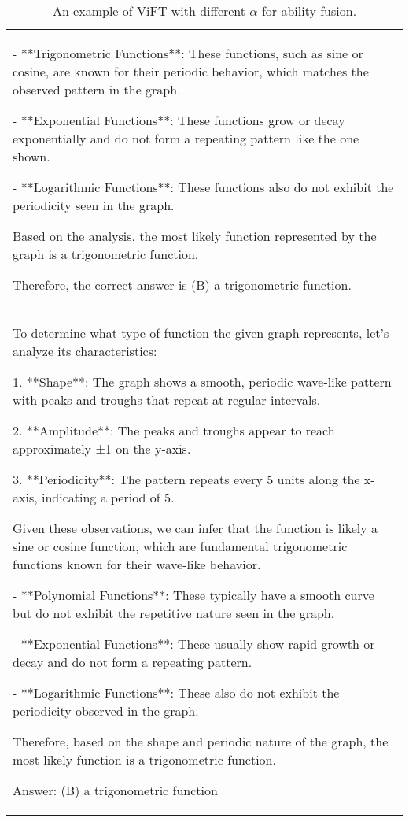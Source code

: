 \begin{table*}[htbp]
\begin{tabular}{p{14cm}}
\begin{tcolorbox}[colback=gray!5, colframe=gray!40, sharp corners, width=\linewidth, boxrule=0.5mm]
- **Trigonometric Functions**: These functions, such as sine or cosine, are known for their periodic behavior, which matches the observed pattern in the graph.

- **Exponential Functions**: These functions grow or decay exponentially and do not form a repeating pattern like the one shown.

- **Logarithmic Functions**: These functions also do not exhibit the periodicity seen in the graph.

Based on the analysis, the most likely function represented by the graph is a trigonometric function.

Therefore, the correct answer is (B) a trigonometric function.

\end{tcolorbox}

        \begin{tcolorbox}[colback=gray!5, colframe=gray!40, sharp corners, width=\linewidth, boxrule=0.5mm]
        \small
        \textbf{$\alpha=1.0$:}
        \\
To determine what type of function the given graph represents, let's analyze its characteristics:

1. **Shape**: The graph shows a smooth, periodic wave-like pattern with peaks and troughs that repeat at regular intervals.

2. **Amplitude**: The peaks and troughs appear to reach approximately ±1 on the y-axis.

3. **Periodicity**: The pattern repeats every 5 units along the x-axis, indicating a period of 5.

Given these observations, we can infer that the function is likely a sine or cosine function, which are fundamental trigonometric functions known for their wave-like behavior.

- **Polynomial Functions**: These typically have a smooth curve but do not exhibit the repetitive nature seen in the graph.

- **Exponential Functions**: These usually show rapid growth or decay and do not form a repeating pattern.

- **Logarithmic Functions**: These also do not exhibit the periodicity observed in the graph.

Therefore, based on the shape and periodic nature of the graph, the most likely function is a trigonometric function.

Answer: (B) a trigonometric function


\end{tcolorbox}

\end{tabular}
\caption{An example of ViFT with different $\alpha$ for ability fusion.}
\label{tab:case4}
\end{table*}

